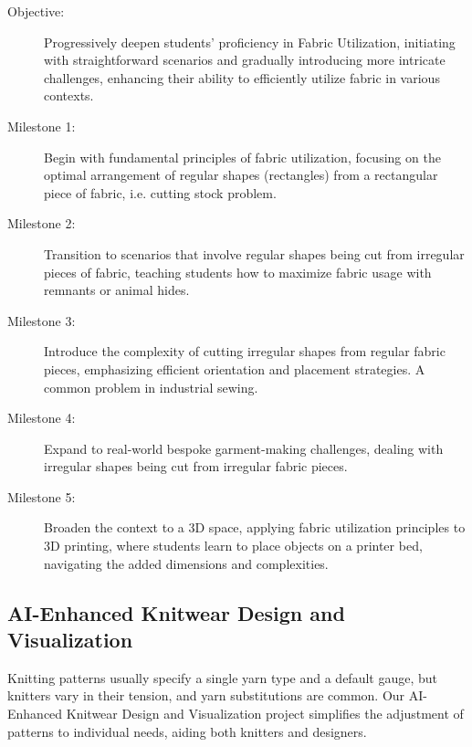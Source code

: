 \documentclass{article}
\begin{document}
    \begin{description}
        \item[Objective:] Progressively deepen students' proficiency in Fabric Utilization,
        initiating with straightforward scenarios and gradually introducing more intricate challenges,
        enhancing their ability to efficiently utilize fabric in various contexts.
        
        \item[Milestone 1:] Begin with fundamental principles of fabric utilization, focusing on the
        optimal arrangement of regular shapes (rectangles) from a rectangular piece of fabric, i.e. cutting stock
        problem.
        
        \item[Milestone 2:] Transition to scenarios that involve regular shapes being cut from irregular
        pieces of fabric, teaching students how to maximize fabric usage with remnants or animal hides.
        
        \item[Milestone 3:] Introduce the complexity of cutting irregular shapes from regular fabric
        pieces, emphasizing efficient orientation and placement strategies. A common problem in industrial sewing.
        
        \item[Milestone 4:] Expand to real-world bespoke garment-making challenges, dealing with irregular
        shapes being cut from irregular fabric pieces.
        
        \item[Milestone 5:] Broaden the context to a 3D space, applying fabric utilization principles to
        3D printing, where students learn to place objects on a printer bed, navigating the added
        dimensions and complexities.
    \end{description}


    \subsection{AI-Enhanced Knitwear Design and Visualization}

    Knitting patterns usually specify a single yarn type and a default gauge, but knitters vary in
    their tension, and yarn substitutions are common. Our AI-Enhanced Knitwear Design and
    Visualization project simplifies the adjustment of patterns to individual needs, aiding both
    knitters and designers.
\end{document}
